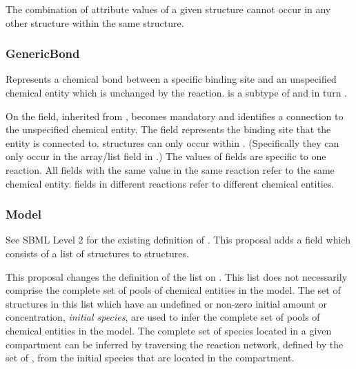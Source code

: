\documentclass{cekarticle}
\begin{document}
The combination of attribute values of a given  structure cannot
occur in any other  structure within the same 
structure.  

\subsubsection{GenericBond}

Represents a chemical bond between a specific binding site and an unspecified chemical entity which is
unchanged by the reaction.
 is a subtype of  and in turn .

On  the  field, inherited from , becomes mandatory and
identifies a connection to the unspecified chemical entity.
The  field represents the binding site that the entity
is connected to.
 structures can only occur within .
(Specifically they can only occur
in the  array/list field in .)
The values of   fields are specific to one reaction. 
All  
fields with the same value in the same reaction refer to the same chemical entity.
  fields in different reactions refer to different chemical entities.

\subsubsection{Model}

See SBML Level 2 for the existing definition of .  This proposal adds a
 field which consists of a list of  structures to
 structures.  

This proposal changes the definition of the  list on .
This list does not necessarily comprise the complete set of pools of chemical entities in the model.
The set of  structures in this list which have an undefined or non-zero
initial amount or concentration, \emph{initial species}, are used to infer the complete set
of pools of chemical entities in the model.  The complete set of species located in a given
compartment can be inferred by traversing the reaction
network, defined by the set of , from the initial species that are located in
the compartment.
\end{document}
